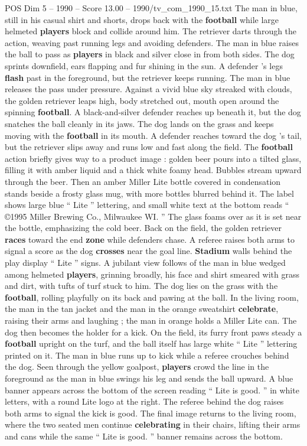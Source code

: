 \begin{textsample}{POS Dim 5 – 1990 – Score 13.00 – 1990/tv\_com\_1990\_15.txt}
The man in blue, still in his casual shirt and shorts, drops back with the \textbf{football} while large helmeted \textbf{players} block and collide around him.
The retriever darts through the action, weaving past running legs and avoiding defenders.
The man in blue raises the ball to pass as \textbf{players} in black and silver close in from both sides.
The dog sprints downfield, ears flapping and fur shining in the sun.
A defender ’s legs \textbf{flash} past in the foreground, but the retriever keeps running.
The man in blue releases the pass under pressure.
Against a vivid blue sky streaked with clouds, the golden retriever leaps high, body stretched out, mouth open around the spinning \textbf{football}.
A black-and-silver defender reaches up beneath it, but the dog snatches the ball cleanly in its jaws.
The dog lands on the grass and keeps moving with the \textbf{football} in its mouth.
A defender reaches toward the dog ’s tail, but the retriever slips away and runs low and fast along the field.
The \textbf{football} action briefly gives way to a product image : golden beer pours into a tilted glass, filling it with amber liquid and a thick white foamy head.
Bubbles stream upward through the beer.
Then an amber Miller Lite bottle covered in condensation stands beside a frosty glass mug, with more bottles blurred behind it.
The label shows large blue “ Lite ” lettering, and small white text at the bottom reads “ {\EmojiFont ©}1995 Miller Brewing Co., Milwaukee WI. ” The glass foams over as it is set near the bottle, emphasizing the cold beer.
Back on the field, the golden retriever \textbf{races} toward the end \textbf{zone} while defenders chase.
A referee raises both arms to signal a score as the dog \textbf{crosses} near the goal line. \textbf{Stadium} walls behind the play display “ Lite ” signs.
A jubilant view follows of the man in blue wedged among helmeted \textbf{players}, grinning broadly, his face and shirt smeared with grass and dirt, with tufts of turf stuck to him.
The dog lies on the grass with the \textbf{football}, rolling playfully on its back and pawing at the ball.
In the living room, the man in the tan jacket and the man in the orange sweatshirt \textbf{celebrate}, raising their arms and laughing ; the man in orange holds a Miller Lite can.
The dog then becomes the holder for a kick.
On the field, its furry front paws steady a \textbf{football} upright on the turf, and the ball itself has large white “ Lite ” lettering printed on it.
The man in blue runs up to kick while a referee crouches behind the dog.
Seen through the yellow goalpost, \textbf{players} crowd the line in the foreground as the man in blue swings his leg and sends the ball upward.
A blue banner appears across the bottom of the screen reading “ Lite is good. ” in white letters, with a round Lite logo at the right.
The referee behind the dog raises both arms to signal the kick is good.
The final image returns to the living room, where the two seated men continue \textbf{celebrating} in their chairs, lifting their arms and cans while the same “ Lite is good. ” banner remains across the bottom.

\end{textsample}
